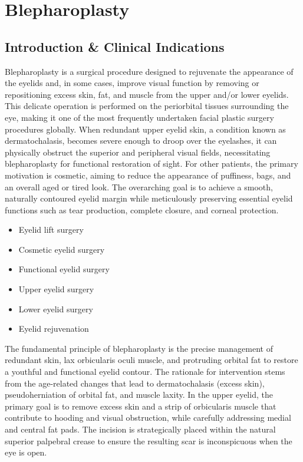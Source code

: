 \chapter{Blepharoplasty}

\section*{Introduction \& Clinical Indications}
Blepharoplasty is a surgical procedure designed to rejuvenate the appearance of the eyelids and, in some cases, improve visual function by removing or repositioning excess skin, fat, and muscle from the upper and/or lower eyelids. This delicate operation is performed on the periorbital tissues surrounding the eye, making it one of the most frequently undertaken facial plastic surgery procedures globally. When redundant upper eyelid skin, a condition known as dermatochalasis, becomes severe enough to droop over the eyelashes, it can physically obstruct the superior and peripheral visual fields, necessitating blepharoplasty for functional restoration of sight. For other patients, the primary motivation is cosmetic, aiming to reduce the appearance of puffiness, bags, and an overall aged or tired look. The overarching goal is to achieve a smooth, naturally contoured eyelid margin while meticulously preserving essential eyelid functions such as tear production, complete closure, and corneal protection.

\begin{itemize}
  \item Eyelid lift surgery
  \item Cosmetic eyelid surgery
  \item Functional eyelid surgery
  \item Upper eyelid surgery
  \item Lower eyelid surgery
  \item Eyelid rejuvenation
\end{itemize}

The fundamental principle of blepharoplasty is the precise management of redundant skin, lax orbicularis oculi muscle, and protruding orbital fat to restore a youthful and functional eyelid contour. The rationale for intervention stems from the age-related changes that lead to dermatochalasis (excess skin), pseudoherniation of orbital fat, and muscle laxity. In the upper eyelid, the primary goal is to remove excess skin and a strip of orbicularis muscle that contribute to hooding and visual obstruction, while carefully addressing medial and central fat pads. The incision is strategically placed within the natural superior palpebral crease to ensure the resulting scar is inconspicuous when the eye is open.

